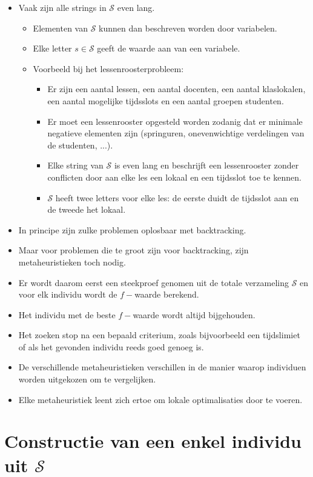 \begin{itemize}
    \item Vaak zijn alle strings in $\mathcal{S}$ even lang.
    \begin{itemize}
        \item Elementen van $\mathcal{S}$ kunnen dan beschreven worden door variabelen.
        \item Elke letter $s \in \mathcal{S}$ geeft de waarde aan van een variabele.
        \item Voorbeeld bij het lessenroosterprobleem:
        \begin{itemize}
            \item Er zijn een aantal lessen, een aantal docenten, een aantal klaslokalen, een aantal mogelijke tijdsslots en een aantal groepen studenten.
            \item Er moet een lessenrooster opgesteld worden zodanig dat er minimale negatieve elementen zijn (springuren, onevenwichtige verdelingen van de studenten, ...).
            \item Elke string van $\mathcal{S}$ is even lang en beschrijft een lessenrooster zonder conflicten door aan elke les een lokaal en een tijdsslot toe te kennen.
            \item $\mathcal{S}$ heeft twee letters voor elke les: de eerste duidt de tijdsslot aan en de tweede het lokaal.
        \end{itemize}
    \end{itemize}
    \item In principe zijn zulke problemen oplosbaar met backtracking.
    \item Maar voor problemen die te groot zijn voor backtracking, zijn metaheuristieken toch nodig.
    \item Er wordt daarom eerst een steekproef genomen uit de totale verzameling $\mathcal{S}$ en voor elk individu wordt de $f-$waarde berekend.
    \item Het individu met de beste $f-$waarde wordt altijd bijgehouden.
    \item Het zoeken stop na een bepaald criterium, zoals bijvoorbeeld een tijdslimiet of als het gevonden individu reeds goed genoeg is.
    \item De verschillende metaheuristieken verschillen in de manier waarop individuen worden uitgekozen om te vergelijken.
    \item Elke metaheuristiek leent zich ertoe om lokale optimalisaties door te voeren.
\end{itemize}


\section{Constructie van een enkel individu uit \texorpdfstring{$\mathcal{S}$}{S}}

